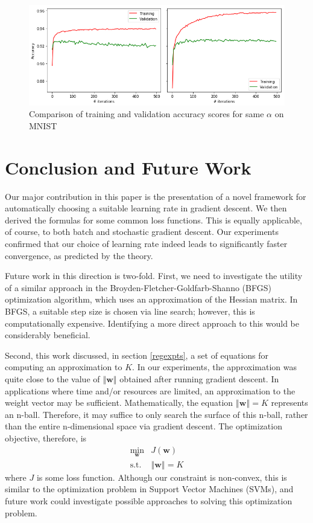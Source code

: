 \documentclass[sigconf,authordraft]{acmart}
\begin{document}
\begin{figure}
    \centering
    \includegraphics[scale=0.33]{mnist_train_val.png}
    \caption{Comparison of training and validation accuracy scores for same $\alpha$ on MNIST}
    \label{fig:classif:2}
\end{figure}

\section{Conclusion and Future Work}
Our major contribution in this paper is the presentation of a novel framework for automatically choosing a suitable learning rate in gradient descent. We then derived the formulas for some common loss functions. This is equally applicable, of course, to both batch and stochastic gradient descent. Our experiments confirmed that our choice of learning rate indeed leads to significantly faster convergence, as predicted by the theory.

Future work in this direction is two-fold. First, we need to investigate the utility of a similar approach in the Broyden-Fletcher-Goldfarb-Shanno (BFGS) optimization algorithm, which uses an approximation of the Hessian matrix. In BFGS, a suitable step size is chosen via line search; however, this is computationally expensive. Identifying a more direct approach to this would be considerably beneficial.

Second, this work discussed, in section \ref{regexpts}, a set of equations for computing an approximation to $K$. In our experiments, the approximation was quite close to the value of $\left\Vert \textbf{w} \right\Vert$ obtained after running gradient descent. In applications where time and/or resources are limited, an approximation to the weight vector may be sufficient. Mathematically, the equation $\left\Vert \textbf{w} \right\Vert = K$ represents an n-ball. Therefore, it may suffice to only search the surface of this n-ball, rather than the entire n-dimensional space via gradient descent. The optimization objective, therefore, is
\[
    \begin{aligned}
        \min\limits_{\textbf{w}} & J(\textbf{w}) \\
        \text{s.t. } & \left\Vert \textbf{w} \right\Vert = K 
    \end{aligned}
\]
where $J$ is some loss function. Although our constraint is non-convex, this is similar to the optimization problem in Support Vector Machines (SVMs), and future work could investigate possible approaches to solving this optimization problem.
\end{document}
